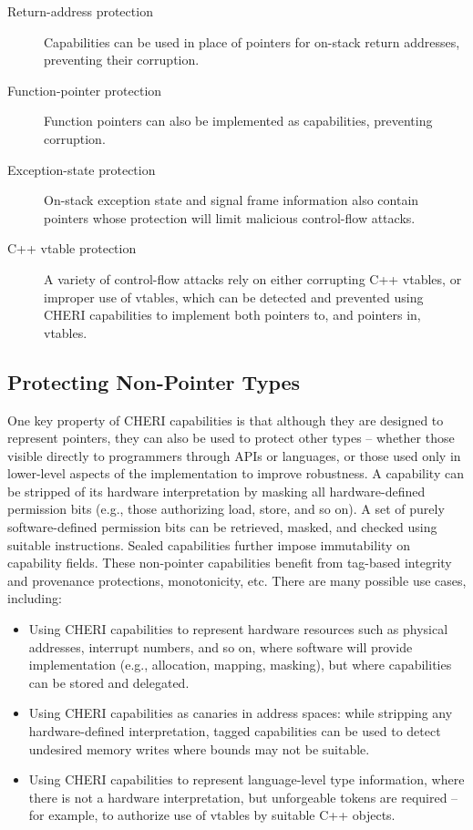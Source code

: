 \begin{description}
\item[Return-address protection] Capabilities can be used in place of pointers
  for on-stack return addresses, preventing their corruption.

\item[Function-pointer protection] Function pointers can also be implemented
  as capabilities, preventing corruption.

\item[Exception-state protection] On-stack exception state and signal
  frame information also contain pointers whose protection will limit
  malicious control-flow attacks.

\item[C++ vtable protection] A variety of control-flow attacks rely on either
  corrupting C++ vtables, or improper use of vtables, which can be detected
  and prevented using CHERI capabilities to implement both pointers to, and
  pointers in, vtables.
\end{description}

\subsection{Protecting Non-Pointer Types}

One key property of CHERI capabilities is that although they are designed to
represent pointers, they can also be used to protect other types -- whether
those visible directly to programmers through APIs or languages, or those used
only in lower-level aspects of the implementation to improve robustness.
A capability can be stripped of its hardware interpretation by masking all
hardware-defined permission bits (e.g., those authorizing load, store, and so
on).
A set of purely software-defined permission bits can be retrieved, masked, and
checked using suitable instructions.
Sealed capabilities further impose immutability on capability fields.
These non-pointer capabilities benefit from tag-based integrity and provenance
protections, monotonicity, etc.
There are many possible use cases, including:

\begin{itemize}
\item Using CHERI capabilities to represent hardware resources such as
  physical addresses, interrupt numbers, and so on, where software will
  provide implementation (e.g., allocation, mapping, masking), but
where capabilities
  can be stored and delegated.

\item Using CHERI capabilities as canaries in address spaces: while stripping
  any hardware-defined interpretation, tagged capabilities can be used to
  detect undesired memory writes where bounds may not be suitable.

\item Using CHERI capabilities to represent language-level type information,
  where there is not a hardware interpretation, but unforgeable tokens are
  required -- for example, to authorize use of vtables by suitable C++
  objects.
\end{itemize}

